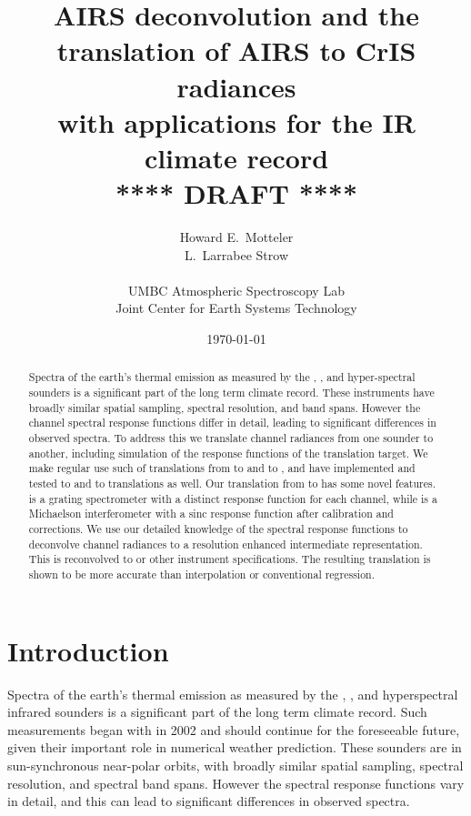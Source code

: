 \documentclass[10pt,twocolumn]{article}
\title{AIRS deconvolution and the \\
       translation of AIRS to CrIS radiances \\ 
       with applications for the IR climate record \\
  \vspace{3mm}
  {****} DRAFT {****}\\
}
\author{Howard E.~Motteler \\
  L.~Larrabee Strow \\
  \\
  UMBC Atmospheric Spectroscopy Lab \\
  Joint Center for Earth Systems Technology \\
}
\date{\today}
\begin{document}
\maketitle

\begin{abstract}

Spectra of the earth's thermal emission as measured by the {\airs},
{\cris}, and {\iasi} hyper-spectral sounders is a significant part
of the long term climate record.  These instruments have broadly
similar spatial sampling, spectral resolution, and band spans.
However the channel spectral response functions differ in detail,
leading to significant differences in observed spectra.  To address
this we translate channel radiances from one sounder to another,
including simulation of the response functions of the translation
target.  We make regular use such of translations from {\airs} to
{\cris} and {\iasi} to {\cris}, and have implemented and tested
{\iasi} to {\airs} and {\cris} to {\airs} translations as well.  
Our translation from {\airs} to {\cris} has some novel features.
{\airs} is a grating spectrometer with a distinct response function
for each channel, while {\cris} is a Michaelson interferometer with
a sinc response function after calibration and corrections.  We use
our detailed knowledge of the {\airs} spectral response functions to
deconvolve {\airs} channel radiances to a resolution enhanced
intermediate representation.  This is reconvolved to {\cris} or
other instrument specifications.  The resulting translation is shown
to be more accurate than interpolation or conventional regression.

\end{abstract}

\section{Introduction}

Spectra of the earth's thermal emission as measured by the {\airs}
\cite{airs1}, {\cris} \cite{cris1,cris2}, and {\iasi} \cite{iasi1}
hyperspectral infrared sounders is a significant part of the long
term climate record.  Such measurements began with {\airs} in 2002
and should continue for the foreseeable future, given their
important role in numerical weather prediction.  These sounders are
in sun-synchronous near-polar orbits, with broadly similar spatial
sampling, spectral resolution, and spectral band spans.  However the
spectral response functions vary in detail, and this can lead to
significant differences in observed spectra.
\end{document}
